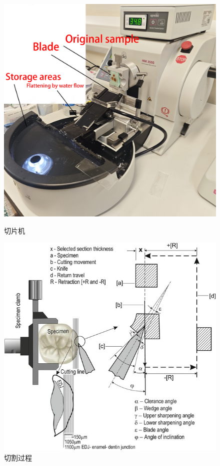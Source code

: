 \begin{figure}[H]
    \centering
    \begin{minipage}{0.35\textwidth}
        \centering
        \includegraphics[width=\textwidth]{./fig/machine - 副本.jpg}
        \caption{切片机}
        \label{fig:machine}
    \end{minipage}
    \begin{minipage}{0.35\textwidth}
        \centering
        \includegraphics[width=\textwidth]{./fig/10266_2018_353_Fig1_HTML.jpg}
        \caption{切割过程}
        \label{fig:cutting_machine}
    \end{minipage}
\end{figure}



